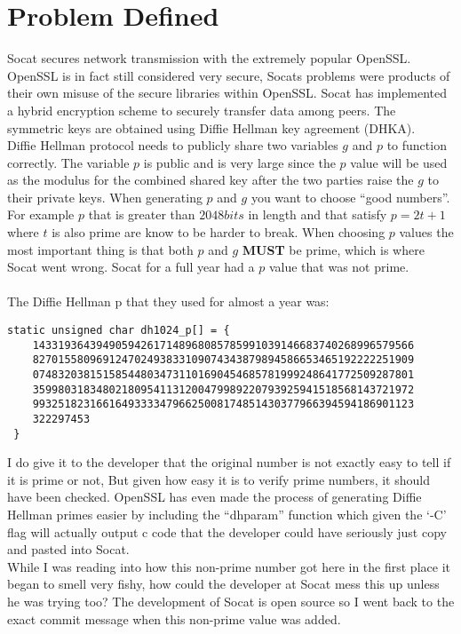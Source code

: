 \documentclass[letterpaper,11pt,notitlepage,fleqn]{article}
\begin{document}
\section{Problem Defined}
\indent Socat secures network transmission with the extremely popular OpenSSL. OpenSSL is in fact still considered very secure, Socats problems were products of their own misuse of the secure libraries within OpenSSL. Socat has implemented a hybrid encryption scheme to securely transfer data among peers. The symmetric keys are obtained using Diffie Hellman key agreement (DHKA).
\\
\indent Diffie Hellman protocol needs to publicly share two variables $g$ and $p$ to function correctly. The variable $p$ is public and is very large since the $p$ value will be used as the modulus for the combined shared key after the two parties raise the $g$ to their private keys. When generating $p$ and $g$ you want to choose “good numbers”. For example $p$ that is greater than $2048bits$ in length and that satisfy $p = 2t+1$ where $t$ is also prime are know to be harder to break.  When choosing $p$ values the most important thing is that both $p$ and $g$ \textbf{MUST} be prime, which is where Socat went wrong. Socat for a full year had a $p$ value that was not prime.
\\
\\
The Diffie Hellman p that they used for almost a year was:
\begin{lstlisting}
static unsigned char dh1024_p[] = {
	143319364394905942617148968085785991039146683740268996579566
	827015580969124702493833109074343879894586653465192222251909
	074832038151585448034731101690454685781999248641772509287801
	359980318348021809541131200479989220793925941518568143721972
	993251823166164933334796625008174851430377966394594186901123
	322297453
 }
\end{lstlisting}
\indent I do give it to the developer that the original number is not exactly easy to tell if it is prime or not, But given how easy it is to verify prime numbers, it should have been checked. OpenSSL has even made the process of generating Diffie Hellman primes easier by including the “dhparam” function which given the ‘-C’ flag will actually output c code that the developer could have seriously just copy and pasted into Socat.
\\
\indent While I was reading into how this non-prime number got here in the first place it began to smell very fishy, how could the developer at Socat mess this up unless he was trying too? The development of Socat is open source so I went back to the exact commit message when this non-prime value was added.
\end{document}
